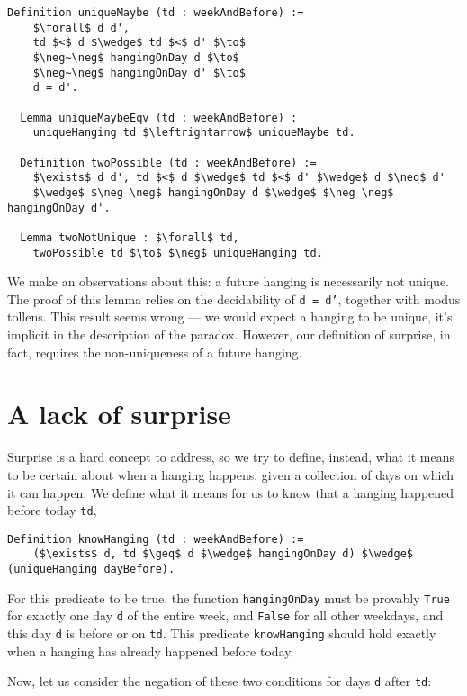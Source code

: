 \documentclass[runningheads]{llncs}
\begin{document}
\begin{lstlisting}[mathescape=true]
  Definition uniqueMaybe (td : weekAndBefore) :=
    $\forall$ d d',
    td $<$ d $\wedge$ td $<$ d' $\to$
    $\neg~\neg$ hangingOnDay d $\to$
    $\neg~\neg$ hangingOnDay d' $\to$
    d = d'.

  Lemma uniqueMaybeEqv (td : weekAndBefore) :
    uniqueHanging td $\leftrightarrow$ uniqueMaybe td.

  Definition twoPossible (td : weekAndBefore) :=
    $\exists$ d d', td $<$ d $\wedge$ td $<$ d' $\wedge$ d $\neq$ d'
    $\wedge$ $\neg \neg$ hangingOnDay d $\wedge$ $\neg \neg$ hangingOnDay d'.

  Lemma twoNotUnique : $\forall$ td,
    twoPossible td $\to$ $\neg$ uniqueHanging td.
\end{lstlisting}

We make an observations about this: a future hanging is
necessarily not unique. The proof of this lemma relies on the decidability of
{\tt d = d'}, together with modus tollens. This result seems wrong --- we would expect a hanging to be
unique, it's implicit in the description of the paradox. However, our definition of
surprise, in fact, requires the non-uniqueness of a future hanging.

\section{A lack of surprise}
\label{sec:lack}

Surprise is a hard concept to address, so we try to define, instead, what it means to be certain about
when a hanging happens, given a collection of days on which it can happen.
We define what it means for us to know that a hanging happened before today {\tt td},

\begin{lstlisting}[mathescape=true]
  Definition knowHanging (td : weekAndBefore) :=
    ($\exists$ d, td $\geq$ d $\wedge$ hangingOnDay d) $\wedge$ (uniqueHanging dayBefore).
\end{lstlisting}

For this predicate to be true, the function {\tt hangingOnDay} must be provably \texttt{True}
for exactly one day {\tt d} of the entire week, and {\tt False} for all other weekdays, and this day {\tt d} is
before or on {\tt td}.
This predicate {\tt knowHanging} should hold exactly when a hanging has already happened
before today.

Now, let us consider the negation of these two conditions for days {\tt d} after {\tt td}:
\end{document}
